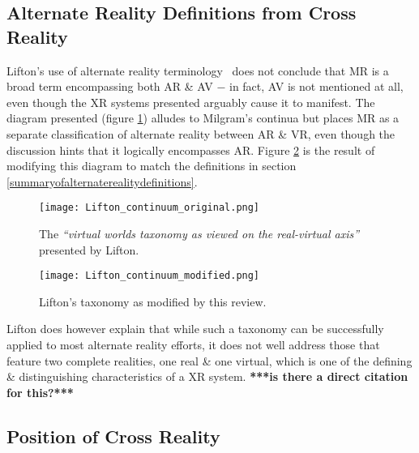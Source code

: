 
\subsection{Alternate Reality Definitions from Cross Reality}

Lifton's use of alternate reality terminology~\cite{Lifton2007a} does not conclude that MR is a broad term encompassing both AR \& AV $-$ in fact, AV is not mentioned at all, even though the XR systems presented arguably cause it to manifest. The diagram presented (figure \ref{original_lifton_axis.png}) alludes to Milgram's continua but places MR as a separate classification of alternate reality between AR \& VR, even though the discussion hints that it logically encompasses AR. Figure \ref{modified_lifton_axis.png} is the result of modifying this diagram to match the definitions in section \ref{summaryofalternaterealitydefinitions}.

\begin{figure}[h]
	\centering
	\texttt{[image: Lifton\_continuum\_original.png]}
	\caption{The \textit{``virtual worlds taxonomy as viewed on the real-virtual axis''} presented by Lifton.}
	\label{original_lifton_axis.png}
\end{figure}

\begin{figure}[h]
	\centering
	\texttt{[image: Lifton\_continuum\_modified.png]}
	\caption{Lifton's taxonomy as modified by this review.}
	\label{modified_lifton_axis.png}
\end{figure}

Lifton does however explain that while such a taxonomy can be successfully applied to most alternate reality efforts, it does not well address those that feature two complete realities, one real \& one virtual, which is one of the defining \& distinguishing characteristics of a XR system. \textbf{***is there a direct citation for this?***}


\subsection{Position of Cross Reality}

\label{positionofcrossreality}

